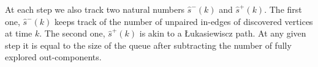
At each step we also track two natural numbers $\hat{s}^-(k)$ and $\hat{s}^+(k)$. The first one, $\hat{s}^-(k)$ keeps track of the number of unpaired in-edges of discovered vertices at time $k$. The second one, $\hat{s}^+(k)$ is akin to a \L{}ukasiewiscz path. At any given step it is equal to the size of the queue after subtracting the number of fully explored out-components.

